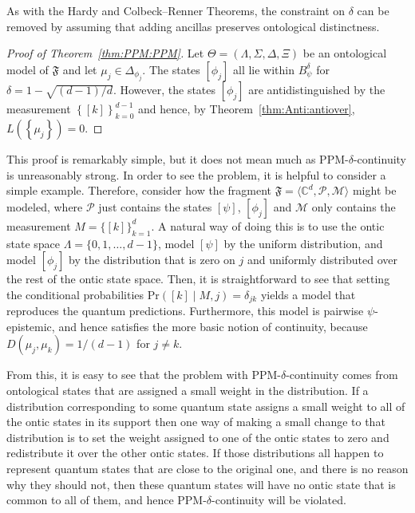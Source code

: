 \documentclass[DIV=calc,fontsize=12pt]{scrartcl} %
\theoremstyle{definition}
\theoremstyle{plain}
\newcommand{\Proj}[1]{\ensuremath{\left [ #1 \right ]}}
\begin{document}
As with the Hardy and Colbeck--Renner Theorems, the constraint on
$\delta$ can be removed by assuming that adding ancillas preserves
ontological distinctness.

\begin{proof}[Proof of Theorem~\ref{thm:PPM:PPM}]
Let $\Theta = (\Lambda, \Sigma, \Delta, \Xi)$ be an ontological model
of $\mathfrak{F}$ and let $\mu_j \in \Delta_{\phi_j}$.  The states
$\Proj{\phi_j}$ all lie within $B^{\delta}_{\psi}$ for $\delta = 1 -
\sqrt{(d-1)/d}$.  However, the states $\Proj{\phi_j}$ are
antidistinguished by the measurement $\left \{ \Proj{k} \right
\}_{k=0}^{d-1}$ and hence, by Theorem~\ref{thm:Anti:antiover}, $L
\left ( \left \{ \mu_j \right \} \right ) = 0$.
\end{proof}

This proof is remarkably simple, but it does not mean much as
PPM-$\delta$-continuity is unreasonably strong.  In order to see the
problem, it is helpful to consider a simple example.  Therefore,
consider how the fragment $\mathfrak{F} = \langle \mathbb{C}^d,
\mathcal{P}, \mathcal{M} \rangle$ might be modeled, where
$\mathcal{P}$ just contains the states $\Proj{\psi}$, $\Proj{\phi_j}$
and $\mathcal{M}$ only contains the measurement $M =
\{\Proj{k}\}_{k=1}^d$.  A natural way of doing this is to use the
ontic state space $\Lambda = \{0,1,\ldots,d-1\}$, model $\Proj{\psi}$
by the uniform distribution, and model $\Proj{\phi_j}$ by the
distribution that is zero on $j$ and uniformly distributed over the
rest of the ontic state space.  Then, it is straightforward to see
that setting the conditional probabilities $\text{Pr} \left (\Proj{k}
\middle | M, j \right ) = \delta_{jk}$ yields a model that
reproduces the quantum predictions.  Furthermore, this model is
pairwise $\psi$-epistemic, and hence satisfies the more basic notion
of continuity, because $D(\mu_j,\mu_k) = 1/(d-1)$ for $j \neq k$.

From this, it is easy to see that the problem with
PPM-$\delta$-continuity comes from ontological states that are
assigned a small weight in the distribution.  If a distribution
corresponding to some quantum state assigns a small weight to all of
the ontic states in its support then one way of making a small change
to that distribution is to set the weight assigned to one of the ontic
states to zero and redistribute it over the other ontic states.  If
those distributions all happen to represent quantum states that are
close to the original one, and there is no reason why they should not,
then these quantum states will have no ontic state that is common to
all of them, and hence PPM-$\delta$-continuity will be violated.
\end{document}

